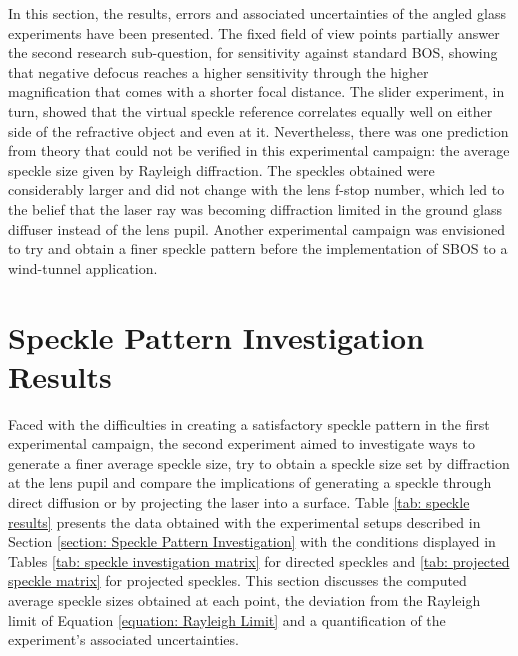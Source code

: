 In this section, the results, errors and associated uncertainties of the angled glass experiments have been presented. The fixed field of view points partially answer the second research sub-question, for sensitivity against standard BOS, showing that negative defocus reaches a higher sensitivity through the higher magnification that comes with a shorter focal distance. The slider experiment, in turn, showed that the virtual speckle reference correlates equally well on either side of the refractive object and even at it. Nevertheless, there was one prediction from theory that could not be verified in this experimental campaign: the average speckle size given by Rayleigh diffraction. The speckles obtained were considerably larger and did not change with the lens f-stop number, which led to the belief that the laser ray was becoming diffraction limited in the ground glass diffuser instead of the lens pupil. Another experimental campaign was envisioned to try and obtain a finer speckle pattern before the implementation of SBOS to a wind-tunnel application.


\section{Speckle Pattern Investigation Results}
\label{section: Speckle Pattern Experiment Results}

Faced with the difficulties in creating a satisfactory speckle pattern in the first experimental campaign, the second experiment aimed to investigate ways to generate a finer average speckle size, try to obtain a speckle size set by diffraction at the lens pupil and compare the implications of generating a speckle through direct diffusion or by projecting the laser into a surface. Table \ref{tab: speckle results} presents the data obtained with the experimental setups described in Section \ref{section: Speckle Pattern Investigation} with the conditions displayed in Tables \ref{tab: speckle investigation matrix} for directed speckles and \ref{tab: projected speckle matrix} for projected speckles. This section discusses the computed average speckle sizes obtained at each point, the deviation from the Rayleigh limit of Equation \ref{equation: Rayleigh Limit} and a quantification of the experiment's associated uncertainties.



